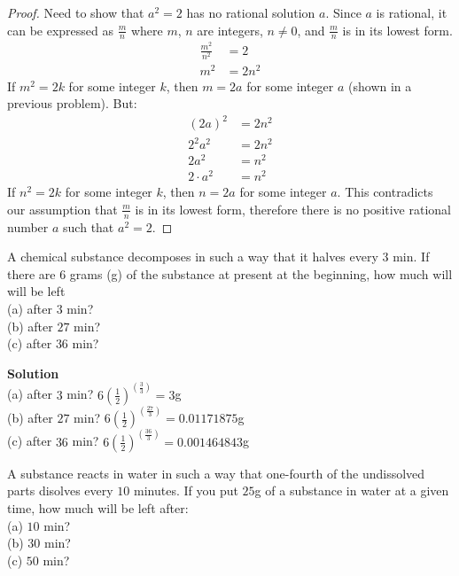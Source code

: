 \documentclass[6pt]{article}
\begin{document}
\begin{proof}
Need to show that $a^2 = 2$ has no rational solution $a$.
Since $a$ is rational, it can be expressed as $\frac{m}{n}$ where $m$, $n$ are integers, 
$n \not = 0$, and $\frac{m}{n}$
is in its lowest form.
\begin{align*}
\frac{m^2}{n^2} &= 2 \\
m^2 &= 2n^2
\end{align*}
If $m^2 = 2k$ for some integer $k$, then $m = 2a$ for some integer $a$ (shown in a previous problem). 
But:
\begin{align*}
{(2a)}^2 &= 2n^2 \\
2^2a^2 &= 2n^2 \\
2 a^2 &= n^2 \\
2 \cdot a^2 &= n^2
\end{align*}
If $n^2 = 2k$ for some integer $k$, then $n = 2a$ for some integer $a$. 
This contradicts our assumption that $\frac{m}{n}$ is in its lowest form, therefore
there is no positive rational number $a$ such that $a^2 = 2$.
\end{proof}


\begin{tcolorbox}[title=Problem 16, breakable]
A chemical substance decomposes in such a way that it halves every $3$ min. If 
there are $6$ grams (g) of the substance at present at the beginning, how much will 
will be left \\
(a) after $3$ min? \\
(b) after $27$ min? \\
(c) after $36$ min?
\end{tcolorbox}

\textbf{Solution} \\
(a) after $3$ min? $6{(\frac{1}{2})}^{(\frac{3}{3})} = 3$g \\
(b) after $27$ min? $6{(\frac{1}{2})}^{(\frac{27}{3})} = 0.01171875$g \\
(c) after $36$ min? $6{(\frac{1}{2})}^{(\frac{36}{3})} = 0.001464843$g

\begin{tcolorbox}[title=Problem 18, breakable]
A substance reacts in water in such a way that one-fourth of the undissolved parts
disolves every $10$ minutes. If you put $25$g of a substance in water at a given
time, how much will be left after: \\
(a) $10$ min? \\
(b) $30$ min? \\
(c) $50$ min?
\end{tcolorbox}
\end{document}
